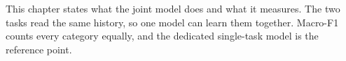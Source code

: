 This chapter states what the joint model does and what it measures. The two tasks read
the same history, so one model can learn them together. Macro-F1 counts every category
equally, and the dedicated single-task model is the reference point.
